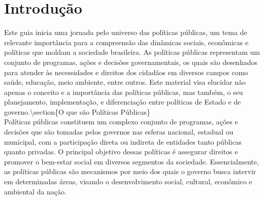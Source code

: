 \documentclass[
   article,       
   12pt,          
   oneside,       
   a4paper,       
   english,       
   brazil,        
   sumario=tradicional
   ]{abntex2}
\begin{document}
\section{Introdução}
Este guia inicia uma jornada pelo universo das políticas públicas, um tema de relevante importância para a compreensão das dinâmicas sociais, econômicas e políticas que moldam a sociedade brasileira. As políticas públicas representam um conjunto de programas, ações e decisões governamentais, os quais são desenhados para atender às necessidades e direitos dos cidadãos em diversos campos como saúde, educação, meio ambiente, entre outros. Este material visa elucidar não apenas o conceito e a importância das políticas públicas, mas também, o seu planejamento, implementação, e diferenciação entre políticas de Estado e de governo.\textbackslash{}section\{O que são Políticas Públicas\}\\Políticas públicas constituem um complexo conjunto de programas, ações e decisões que são tomadas pelos governos nas esferas nacional, estadual ou municipal, com a participação direta ou indireta de entidades tanto públicas quanto privadas. O principal objetivo dessas políticas é assegurar direitos e promover o bem-estar social em diversos segmentos da sociedade. Essencialmente, as políticas públicas são mecanismos por meio dos quais o governo busca intervir em determinadas áreas, visando o desenvolvimento social, cultural, econômico e ambiental da nação.
\end{document}
